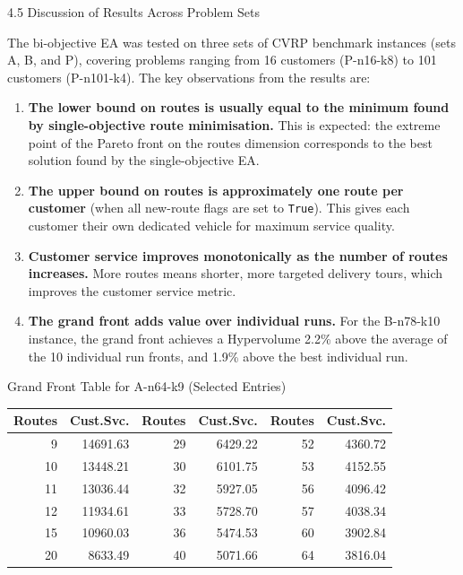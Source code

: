 \documentclass[aspectratio=169,10pt]{beamer}
\begin{document}
\begin{frame}[allowframebreaks]{4.5 Discussion of Results Across Problem Sets}

  The bi-objective EA was tested on three sets of CVRP benchmark instances (sets
  A, B, and P), covering problems ranging from 16 customers (P-n16-k8) to
  101 customers (P-n101-k4).  The key observations from the results are:

  \begin{enumerate}
    \item \textbf{The lower bound on routes is usually equal to the minimum
      found by single-objective route minimisation.}  This is expected: the
      extreme point of the Pareto front on the routes dimension corresponds to
      the best solution found by the single-objective EA.

    \item \textbf{The upper bound on routes is approximately one route per
      customer} (when all new-route flags are set to \texttt{True}).  This gives
      each customer their own dedicated vehicle for maximum service quality.

    \item \textbf{Customer service improves monotonically as the number of routes
      increases.}  More routes means shorter, more targeted delivery tours, which
      improves the customer service metric.

    \item \textbf{The grand front adds value over individual runs.}  For the
      B-n78-k10 instance, the grand front achieves a Hypervolume 2.2\% above
      the average of the 10 individual run fronts, and 1.9\% above the best
      individual run.
  \end{enumerate}

  \framebreak

  \begin{block}{Grand Front Table for A-n64-k9 (Selected Entries)}
    \small
    \begin{tabular}{rr | rr | rr}
      \toprule
      Routes & Cust.Svc. & Routes & Cust.Svc. & Routes & Cust.Svc. \\
      \midrule
      9  & 14691.63 & 29 & 6429.22 & 52 & 4360.72 \\
      10 & 13448.21 & 30 & 6101.75 & 53 & 4152.55 \\
      11 & 13036.44 & 32 & 5927.05 & 56 & 4096.42 \\
      12 & 11934.61 & 33 & 5728.70 & 57 & 4038.34 \\
      15 & 10960.03 & 36 & 5474.53 & 60 & 3902.84 \\
      20 & 8633.49  & 40 & 5071.66 & 64 & 3816.04 \\
      \bottomrule
    \end{tabular}
  \end{block}


\end{frame}
\end{document}
